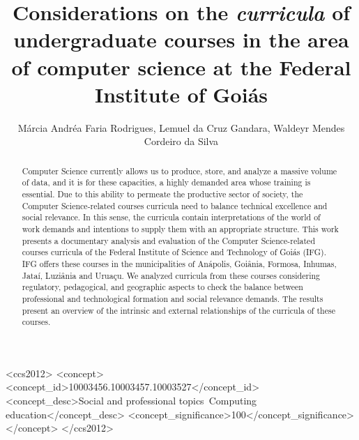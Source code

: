 \documentclass[sigconf, review]{educomp}
\begin{document}
\title[Computer Science undergraduate curricula at IFG]{Considerations on the \textit{curricula} of undergraduate courses in the area of computer science at the Federal Institute of Goi\'as}

\author{Márcia Andréa Faria Rodrigues, Lemuel da Cruz Gandara, Waldeyr Mendes Cordeiro da Silva}

\renewcommand{\shortauthors}{-}

\newcommand{\showDOI}[1]{\unskip}


\begin{abstract}
Computer Science currently allows us to produce, store, and analyze a massive volume of data, and it is for these capacities, a highly demanded area whose training is essential. 
Due to this ability to permeate the productive sector of society, the Computer Science-related courses curricula need to balance technical excellence and social relevance. 
In this sense, the curricula contain interpretations of the world of work demands and intentions to supply them with an appropriate structure. 
This work presents a documentary analysis and evaluation of the Computer Science-related courses curricula of the Federal Institute of Science and Technology of Goiás (IFG).
IFG offers these courses in the municipalities of Anápolis, Goiânia, Formosa, Inhumas, Jataí, Luziânia and Uruaçu. 
We analyzed curricula from these courses considering regulatory, pedagogical, and geographic aspects to check the balance between professional and technological formation and social relevance demands.
The results present an overview of the intrinsic and external relationships of the curricula of these courses.
\end{abstract}

\begin{CCSXML}
<ccs2012>
<concept>
<concept_id>10003456.10003457.10003527</concept_id>
<concept_desc>Social and professional topics~Computing education</concept_desc>
<concept_significance>100</concept_significance>
</concept>
</ccs2012>
\end{CCSXML}
\end{document}
